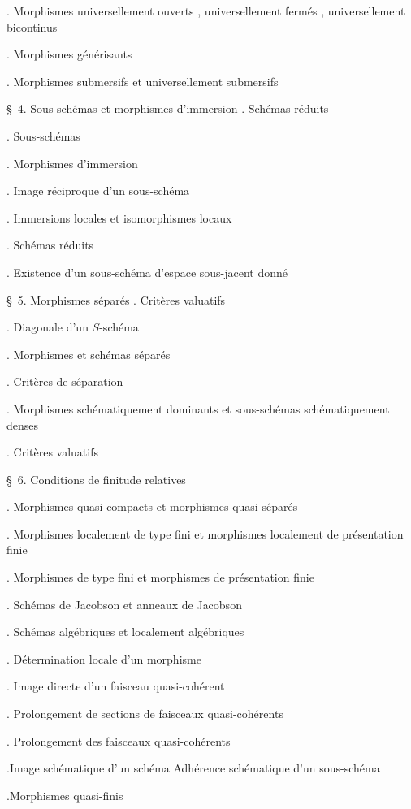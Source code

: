 
\noindent{}. Morphismes universellement ouverts , universellement fermés , universellement bicontinus\dotfill

\noindent{}. Morphismes générisants\dotfill

\noindent{}. Morphismes submersifs et universellement submersifs

\noindent\quad \S\ 4. Sous-schémas et morphismes d'immersion . Schémas réduits\dotfill

\noindent{}. Sous-schémas\dotfill

\noindent{}. Morphismes d'immersion\dotfill

\noindent{}. Image réciproque d'un sous-schéma\dotfill

\noindent{}. Immersions locales et isomorphismes locaux\dotfill

\noindent{}. Schémas réduits\dotfill

\noindent{}. Existence d'un sous-schéma d'espace sous-jacent donné\dotfill

\noindent\quad \S\ 5. Morphismes séparés . Critères valuatifs\dotfill

\noindent{}. Diagonale d'un $S$-schéma\dotfill

\noindent{}. Morphismes et schémas séparés\dotfill

\noindent{}. Critères de séparation\dotfill

\noindent{}. Morphismes schématiquement dominants et sous-schémas schématiquement denses\dotfill

\noindent{}. Critères valuatifs\dotfill

\noindent\quad \S\ 6. Conditions de finitude relatives\dotfill

\noindent{}. Morphismes quasi-compacts et morphismes quasi-séparés\dotfill

\noindent{}. Morphismes localement de type fini et morphismes localement de présentation finie\dotfill

\noindent{}. Morphismes de type fini et morphismes de présentation finie\dotfill

\noindent{}. Schémas de Jacobson et anneaux de Jacobson\dotfill

\noindent{}. Schémas algébriques et localement algébriques\dotfill

\noindent{}. Détermination locale d'un morphisme\dotfill

\noindent{}. Image directe d'un faisceau quasi-cohérent\dotfill

\noindent{}. Prolongement de sections de faisceaux quasi-cohérents

\noindent{}. Prolongement des faisceaux quasi-cohérents\dotfill

\noindent{}.Image schématique d'un schéma Adhérence schématique d'un sous-schéma\dotfill

\noindent{}.Morphismes quasi-finis\dotfill

